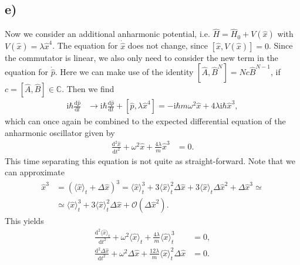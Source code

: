 \documentclass[english, parskip=full]{scrartcl}
\newcommand{\bra}{}
\newcommand{\kla}{}
\newcommand{\klam}{}
\newcommand{\tecxt}{}
\renewcommand{\i}{\text{i}}
\begin{document}
\subsection*{e)}
Now we consider an additional anharmonic potential, i.e. $\hat{H}=\hat{H}_0 + V(\hat{x})$ with $V(\hat{x})=\lambda\hat{x}^4$.
The equation for $\dot{\hat{x}}$ does not change, since $\klam\left[ \hat{x}, V(\hat{x}) \right] = 0$.
Since the commutator is linear, we also only need to consider the new term in the equation for $\dot{\hat{p}}$.
Here we can make use of the identity $\klam\left[ \hat{A}, \hat{B}^N \right] = Nc\hat{B}^{N-1}$, if $c=\klam\left[ \hat{A}, \hat{B} \right]\in\mathbb{C}$.
Then we find
\begin{align}
\i\hbar\frac{\tecxt\text{d}\hat{p}}{\tecxt\text{d}t} &\rightarrow \i\hbar\frac{\tecxt\text{d}\hat{p}}{\tecxt\text{d}t} + \klam\left[ \hat{p},\lambda\hat{x}^4 \right] = -\i\hbar m\omega^2\hat{x} + 4\lambda \i\hbar \hat{x}^3,
\end{align}
which can once again be combined to the expected differential equation of the anharmonic oscillator given by
\begin{align}
\frac{\tecxt\text{d}^2\hat{x}}{\tecxt\text{d}t^2} + \omega^2\hat{x} + \frac{4\lambda}{m}\hat{x}^3&=0.
\end{align}
This time separating this equation is not quite as straight-forward.
Note that we can approximate
\begin{align}
\hat{x}^3 &= \kla\left( \bra\langle \hat{x} \rangle_t + \Delta\hat{x} \right)^3 = \bra\langle \hat{x} \rangle_t^3 + 3\bra\langle \hat{x} \rangle_t^2\Delta\hat{x} + 3\bra\langle \hat{x} \rangle_t\Delta\hat{x}^2 +  \Delta\hat{x}^3\simeq \\
&\simeq\bra\langle \hat{x} \rangle_t^3 + 3\bra\langle \hat{x} \rangle_t^2\Delta\hat{x} + \mathcal{O}\kla\left( \Delta\hat{x}^2 \right).
\end{align}
This yields
\begin{align}
\frac{\tecxt\text{d}^2\bra\langle \hat{x} \rangle_t}{\tecxt\text{d}t^2}+\omega^2\bra\langle \hat{x} \rangle_t + \frac{4\lambda}{m}\bra\langle \hat{x} \rangle_t^3&=0,\\
\frac{\tecxt\text{d}^2\Delta\hat{x}}{\tecxt\text{d}t^2}+\omega^2\Delta\hat{x} + \frac{12\lambda}{m}\bra\langle \hat{x} \rangle_t^2\Delta\hat{x}&=0.
\end{align}


\newpage
\end{document}
